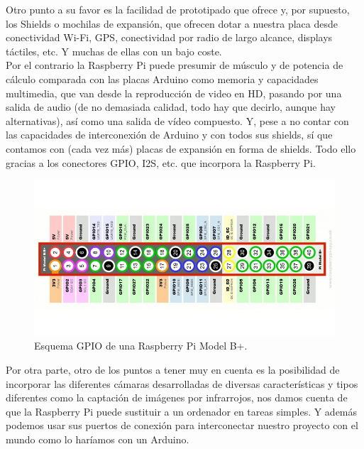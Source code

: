 Otro punto a su favor es la facilidad de prototipado que ofrece y, por supuesto, los Shields o mochilas de expansión, que ofrecen dotar a nuestra placa desde conectividad Wi-Fi, 
GPS, conectividad por radio de largo alcance, displays táctiles, etc. Y muchas de ellas con un bajo coste.\\

Por el contrario la Raspberry Pi puede presumir de músculo y de potencia de cálculo comparada con las placas Arduino como memoria y capacidades multimedia, que van desde la 
reproducción de video en HD, pasando por una salida de audio (de no demasiada calidad, todo hay que decirlo, aunque hay alternativas), así como una salida de vídeo compuesto.
Y, pese a no contar con las capacidades de interconexión de Arduino y con todos sus shields, sí que contamos con (cada vez más) placas de expansión en forma de shields. 
Todo ello gracias a los conectores GPIO, I2S, etc. que incorpora la Raspberry Pi.\\

\begin{figure}[H]
  \begin{center}
    \includegraphics[scale=0.4]{imagenes/robot/gpio-conexiones.jpg}
  \end{center}
  \caption{Esquema GPIO de una Raspberry Pi Model B+.}
  \label{gantt:tareas01}
\end{figure}

Por otra parte, otro de los puntos a tener muy en cuenta es la posibilidad de incorporar las diferentes cámaras desarrolladas de diversas características y tipos diferentes como
la captación de imágenes por infrarrojos, nos damos cuenta de que la Raspberry Pi puede sustituir a un ordenador en tareas simples. Y además podemos usar sus puertos de conexión
para interconectar nuestro proyecto con el mundo como lo haríamos con un Arduino.\\

